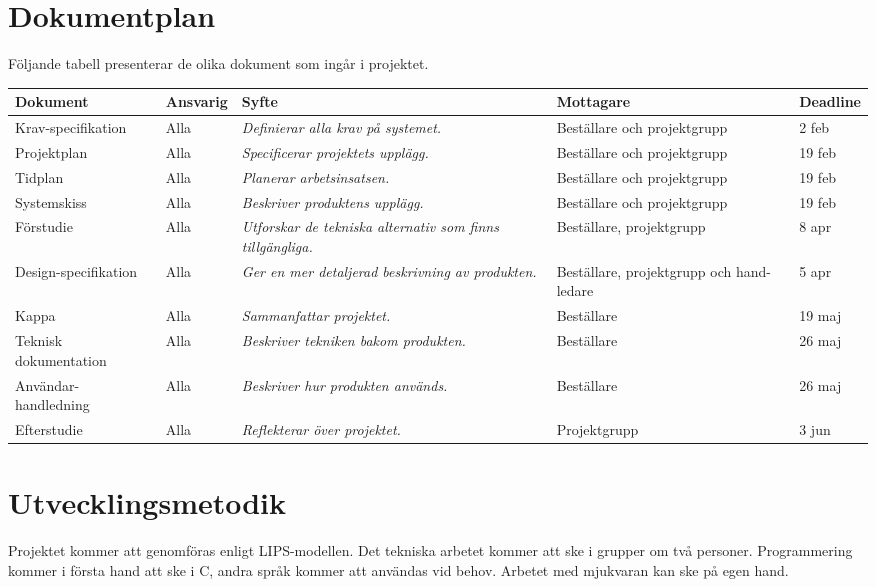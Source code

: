 \documentclass[11pt]{article}
\begin{document}
\begin{flushleft}
\begin{longtable}{| p{.2\linewidth} | p{.2\linewidth} | p{.5\linewidth} |}
\end{longtable}

\pagebreak
\section{Dokumentplan}
Följande tabell presenterar de olika dokument som ingår i projektet. 

\begin{longtable}{| p{.17\linewidth} | p{.11\linewidth} | p{.31\linewidth} | p{.15\linewidth} | p{.11\linewidth} |} \hline
\textbf{Dokument} & \textbf{Ansvarig} & \textbf{Syfte} & \textbf{Mottagare} & \textbf{Deadline} \\ \hline
Krav-specifikation & Alla & \textit{Definierar alla krav på systemet.} & Beställare och projektgrupp & 2 feb \\ \hline
Projektplan & Alla & \textit{Specificerar projektets upplägg.} & Beställare och projektgrupp & 19 feb \\ \hline
Tidplan & Alla & \textit{Planerar arbetsinsatsen.} & Beställare och projektgrupp & 19 feb \\ \hline
Systemskiss & Alla & \textit{Beskriver produktens upplägg.} & Beställare och projektgrupp & 19 feb \\ \hline
Förstudie & Alla & \textit{Utforskar de tekniska alternativ som finns tillgängliga.} & Beställare, projektgrupp & 8 apr \\ \hline
Design-specifikation & Alla & \textit{Ger en mer detaljerad beskrivning av produkten.} & Beställare, projektgrupp och hand-ledare & 5 apr \\ \hline
Kappa & Alla & \textit{Sammanfattar projektet.} & Beställare & 19 maj \\ \hline
Teknisk \mbox{dokumentation} & Alla & \textit{Beskriver tekniken bakom produkten.} & Beställare & 26 maj\\ \hline
Användar-handledning & Alla & \textit{Beskriver hur produkten används.} & Beställare & 26 maj \\ \hline
Efterstudie & Alla & \textit{Reflekterar över projektet.} & Projektgrupp & 3 jun \\ \hline

\end{longtable}

\pagebreak
\section{Utvecklingsmetodik}
Projektet kommer att genomföras enligt LIPS-modellen. Det tekniska arbetet kommer att ske i grupper om två personer. Programmering kommer i första hand att ske i C, andra språk kommer att användas vid behov. Arbetet med mjukvaran kan ske på egen hand.


\end{flushleft}
\end{document}
